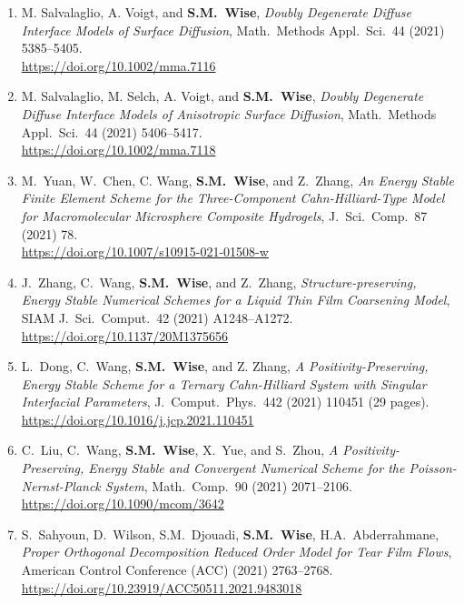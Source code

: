 \documentclass[11pt]{letter}
\begin{document}
\begin{enumerate}
	\item
M. Salvalaglio, A. Voigt, and \textbf{S.M.~Wise}, {\sl Doubly Degenerate Diffuse Interface Models of Surface Diffusion}, Math.~Methods Appl.~Sci.~44 (2021) 5385--5405.
	\\
\url{https://doi.org/10.1002/mma.7116}

	\item
M. Salvalaglio, M. Selch, A. Voigt, and \textbf{S.M.~Wise}, {\sl Doubly Degenerate Diffuse Interface Models of Anisotropic Surface Diffusion}, Math.~Methods Appl.~Sci.~44 (2021) 5406--5417.
	\\
\url{https://doi.org/10.1002/mma.7118}

	\item
M.~Yuan, W.~Chen, C. Wang, \textbf{S.M.~Wise}, and Z.~Zhang, {\sl An Energy Stable Finite Element Scheme for the Three-Component Cahn-Hilliard-Type Model for Macromolecular Microsphere Composite Hydrogels}, J.~Sci.~Comp.~87 (2021) 78.
	\\ 
\url{https://doi.org/10.1007/s10915-021-01508-w}

	\item
J.~Zhang, C.~Wang, \textbf{S.M.~Wise}, and Z.~Zhang, {\sl Structure-preserving, Energy Stable Numerical Schemes for a Liquid Thin Film Coarsening Model}, SIAM J.~Sci.~Comput.~42 (2021) A1248--A1272.
	\\ 
\url{https://doi.org/10.1137/20M1375656}

	\item
L.~Dong, C.~Wang, \textbf{S.M.~Wise}, and Z. Zhang, {\sl A Positivity-Preserving, Energy Stable Scheme for a Ternary Cahn-Hilliard System with Singular Interfacial Parameters}, J.~Comput.~Phys.~442 (2021) 110451 (29 pages).
	\\ 
\url{https://doi.org/10.1016/j.jcp.2021.110451}

	\item
C.~Liu, C.~Wang, \textbf{S.M.~Wise}, X.~Yue, and S.~Zhou, {\sl A Positivity-Preserving, Energy Stable and Convergent Numerical Scheme for the Poisson-Nernst-Planck System}, Math.~Comp.~90 (2021) 2071--2106.
	\\ 
\url{https://doi.org/10.1090/mcom/3642}

	\item
S.~Sahyoun, D.~Wilson, S.M.~Djouadi, \textbf{S.M.~Wise}, H.A.~Abderrahmane, {\sl Proper Orthogonal Decomposition Reduced Order Model for Tear Film Flows}, American Control Conference (ACC) (2021) 2763--2768.
	\\
\url{https://doi.org/10.23919/ACC50511.2021.9483018}


\end{enumerate}
\end{document}
